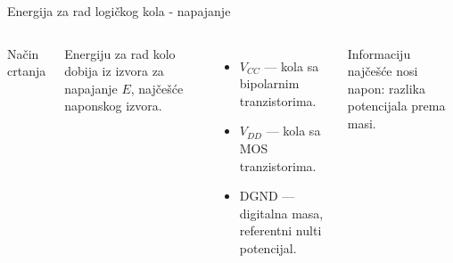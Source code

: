 \begin{frame}[label=08-s005]{Energija za rad logičkog kola - napajanje}
\begin{columns}[c,onlytextwidth]
\centering
\par\medskip
Način crtanja\par\medskip

Energiju za rad kolo dobija iz izvora za napajanje $E$, najčešće naponskog izvora.
\medskip\par
\begin{itemize}
\item $V_{CC}$ — kola sa bipolarnim tranzistorima.
\item $V_{DD}$ — kola sa MOS tranzistorima.
\item DGND — digitalna masa, referentni nulti potencijal.
\end{itemize}
Informaciju najčešće nosi napon: razlika potencijala prema masi.
\end{columns}
\end{frame}
